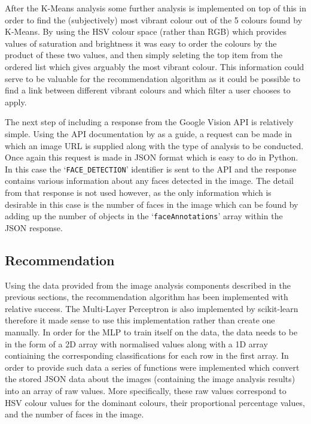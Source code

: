 \documentclass[a4paper,12pt]{report}
\begin{document}

      After the K-Means analysis some further analysis is implemented on top of this in order to find the (subjectively) most vibrant colour out of the 5 colours found by K-Means. By using the HSV colour space (rather than RGB) which provides values of saturation and brightness it was easy to order the colours by the product of these two values, and then simply seleting the top item from the ordered list which gives arguably the most vibrant colour. This information could serve to be valuable for the recommendation algorithm as it could be possible to find a link between different vibrant colours and which filter a user chooses to apply.

      The next step of including a response from the Google Vision API is relatively simple. Using the API documentation by \cite{vision2018apidoc} as a guide, a request can be made in which an image URL is supplied along with the type of analysis to be conducted. Once again this request is made in JSON format which is easy to do in Python. In this case the ‘\texttt{FACE\_DETECTION}’ identifier is sent to the API and the response contains various information about any faces detected in the image. The detail from that response is not used however, as the only information which is desirable in this case is the number of faces in the image which can be found by adding up the number of objects in the ‘\texttt{faceAnnotations}’ array within the JSON response.

    \subsection{Recommendation} \label{sec:imp-recc}
      Using the data provided from the image analysis components described in the previous sections, the recommendation algorithm has been implemented with relative success. The Multi-Layer Perceptron is also implemented by scikit-learn therefore it made sense to use this implementation rather than create one manually. In order for the MLP to train itself on the data, the data needs to be in the form of a 2D array with normalised values along with a 1D array contiaining the corresponding classifications for each row in the first array. In order to provide such data a series of functions were implemented which convert the stored JSON data about the images (containing the image analysis results) into an array of raw values. More specifically, these raw values correspond to HSV colour values for the dominant colours, their proportional percentage values, and the number of faces in the image.
\end{document}
